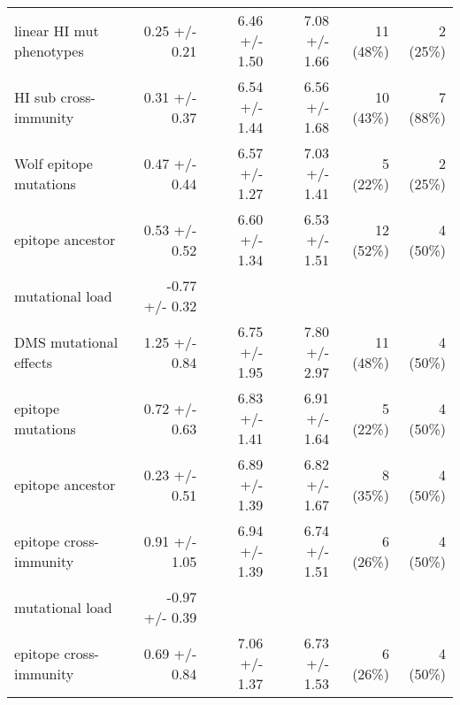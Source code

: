 \begin{tabular*}{1.05\textwidth}{lrrrrr}
linear HI mut phenotypes & 0.25 +/- 0.21 & 6.46 +/- 1.50 & 7.08 +/- 1.66 & 11 (48\%) & 2 (25\%) \\
HI sub cross-immunity & 0.31 +/- 0.37 & 6.54 +/- 1.44 & 6.56 +/- 1.68 & 10 (43\%) & 7 (88\%) \\
Wolf epitope mutations & 0.47 +/- 0.44 & 6.57 +/- 1.27 & 7.03 +/- 1.41 & 5 (22\%) & 2 (25\%) \\
epitope ancestor & 0.53 +/- 0.52 & 6.60 +/- 1.34 & 6.53 +/- 1.51 & 12 (52\%) & 4 (50\%) \\
\hspace{5mm}mutational load & -0.77 +/- 0.32 & & & & \\
DMS mutational effects & 1.25 +/- 0.84 & 6.75 +/- 1.95 & 7.80 +/- 2.97 & 11 (48\%) & 4 (50\%) \\
epitope mutations & 0.72 +/- 0.63 & 6.83 +/- 1.41 & 6.91 +/- 1.64 & 5 (22\%) & 4 (50\%) \\
epitope ancestor & 0.23 +/- 0.51 & 6.89 +/- 1.39 & 6.82 +/- 1.67 & 8 (35\%) & 4 (50\%) \\
epitope cross-immunity & 0.91 +/- 1.05 & 6.94 +/- 1.39 & 6.74 +/- 1.51 & 6 (26\%) & 4 (50\%) \\
\hspace{5mm}mutational load & -0.97 +/- 0.39 & & & & \\
epitope cross-immunity & 0.69 +/- 0.84 & 7.06 +/- 1.37 & 6.73 +/- 1.53 & 6 (26\%) & 4 (50\%) \\

\bottomrule
\end{tabular*}
